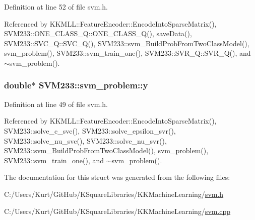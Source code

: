 Definition at line 52 of file svm.\+h.



Referenced by K\+K\+M\+L\+L\+::\+Feature\+Encoder\+::\+Encode\+Into\+Sparse\+Matrix(), S\+V\+M233\+::\+O\+N\+E\+\_\+\+C\+L\+A\+S\+S\+\_\+\+Q\+::\+O\+N\+E\+\_\+\+C\+L\+A\+S\+S\+\_\+\+Q(), save\+Data(), S\+V\+M233\+::\+S\+V\+C\+\_\+\+Q\+::\+S\+V\+C\+\_\+\+Q(), S\+V\+M233\+::svm\+\_\+\+Build\+Prob\+From\+Two\+Class\+Model(), svm\+\_\+problem(), S\+V\+M233\+::svm\+\_\+train\+\_\+one(), S\+V\+M233\+::\+S\+V\+R\+\_\+\+Q\+::\+S\+V\+R\+\_\+\+Q(), and $\sim$svm\+\_\+problem().

\subsubsection[{\texorpdfstring{y}{y}}]{\setlength{\rightskip}{0pt plus 5cm}double$\ast$ S\+V\+M233\+::svm\+\_\+problem\+::y}\hypertarget{struct_s_v_m233_1_1svm__problem_a0883e07a3006cd2bb31eeb61c3a8c453}{}\label{struct_s_v_m233_1_1svm__problem_a0883e07a3006cd2bb31eeb61c3a8c453}


Definition at line 49 of file svm.\+h.



Referenced by K\+K\+M\+L\+L\+::\+Feature\+Encoder\+::\+Encode\+Into\+Sparse\+Matrix(), S\+V\+M233\+::solve\+\_\+c\+\_\+svc(), S\+V\+M233\+::solve\+\_\+epsilon\+\_\+svr(), S\+V\+M233\+::solve\+\_\+nu\+\_\+svc(), S\+V\+M233\+::solve\+\_\+nu\+\_\+svr(), S\+V\+M233\+::svm\+\_\+\+Build\+Prob\+From\+Two\+Class\+Model(), svm\+\_\+problem(), S\+V\+M233\+::svm\+\_\+train\+\_\+one(), and $\sim$svm\+\_\+problem().



The documentation for this struct was generated from the following files\+:\begin{DoxyCompactItemize}
\item 
C\+:/\+Users/\+Kurt/\+Git\+Hub/\+K\+Square\+Libraries/\+K\+K\+Machine\+Learning/\hyperlink{svm_8h}{svm.\+h}\item 
C\+:/\+Users/\+Kurt/\+Git\+Hub/\+K\+Square\+Libraries/\+K\+K\+Machine\+Learning/\hyperlink{svm_8cpp}{svm.\+cpp}\end{DoxyCompactItemize}
